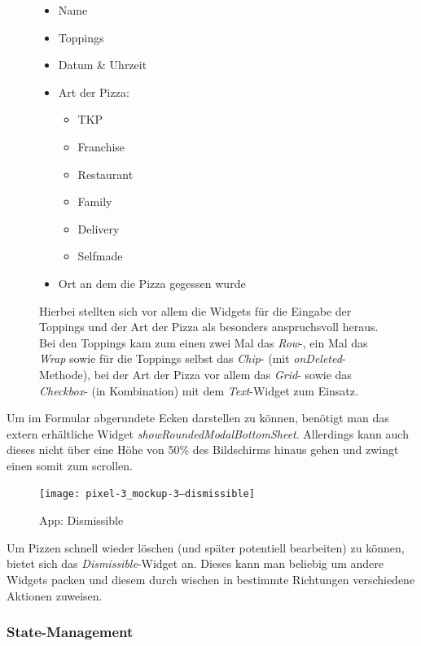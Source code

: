 \begin{figure}[H]
        \begin{itemize}
            \itemsep-0.4em
            \item Name
            \item Toppings
            \item Datum \& Uhrzeit
            \item Art der Pizza:
            \begin{itemize}
                \itemsep-0.4em
                \item \ac{TKP}
                \item Franchise
                \item Restaurant
                \item Family
                \item Delivery
                \item Selfmade
            \end{itemize}
            \item Ort an dem die Pizza gegessen wurde
        \end{itemize}

        Hierbei stellten sich vor allem die Widgets für die
        Eingabe der Toppings und der Art der Pizza als besonders
        anspruchsvoll heraus. Bei den Toppings kam zum einen
        zwei Mal das \textit{Row}-, ein Mal das \textit{Wrap}
        sowie für die Toppings selbst das \textit{Chip}-
        (mit \textit{onDeleted}-Methode), bei der
        Art der Pizza vor allem das \textit{Grid}- sowie
        das \textit{Checkbox}- (in Kombination) mit dem \textit{Text}-Widget
        zum Einsatz.
    \endminipage\hfill
\end{figure}
Um im Formular abgerundete Ecken darstellen zu können, benötigt man
das extern erhältliche Widget \textit{showRoundedModalBottomSheet}.
Allerdings kann auch dieses nicht über eine Höhe von 50\% des Bildschirms
hinaus gehen und zwingt einen somit zum scrollen.

\begin{figure}[H]
    \centering
    \texttt{[image: pixel-3\_mockup-3--dismissible]}
    \caption{App: Dismissible}
\end{figure}

Um Pizzen schnell wieder löschen (und später potentiell bearbeiten)
zu können, bietet sich das \textit{Dismissible}-Widget an.
Dieses kann man beliebig um andere Widgets packen und diesem
durch wischen in bestimmte Richtungen verschiedene Aktionen zuweisen.

\subsubsection{State-Management}


